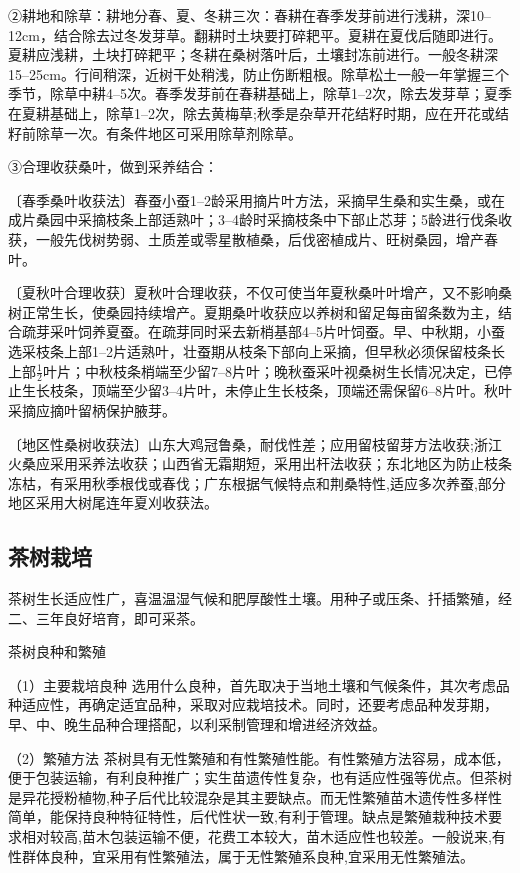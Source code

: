 \documentclass{ctexbook}
\begin{document}
②耕地和除草：耕地分春、夏、冬耕三次：春耕在春季发芽前进行浅耕，深10--12cm，结合除去过冬发芽草。翻耕时土块要打碎耙平。夏耕在夏伐后随即进行。夏耕应浅耕，土块打碎耙平；冬耕在桑树落叶后，土壤封冻前进行。一般冬耕深15--25cm。行间稍深，近树干处稍浅，防止伤断粗根。除草松土一般一年掌握三个季节，除草中耕4--5次。春季发芽前在春耕基础上，除草1--2次，除去发芽草；夏季在夏耕基础上，除草1--2次，除去黄梅草;秋季是杂草开花结籽时期，应在开花或结籽前除草一次。有条件地区可采用除草剂除草。

③合理收获桑叶，做到采养结合：

〔春季桑叶收获法〕春蚕小蚕1--2龄采用摘片叶方法，采摘早生桑和实生桑，或在成片桑园中采摘枝条上部适熟叶；3--4龄时采摘枝条中下部止芯芽；5龄进行伐条收获，一般先伐树势弱、土质差或零星散植桑，后伐密植成片、旺树桑园，增产春叶。

〔夏秋叶合理收获〕夏秋叶合理收获，不仅可使当年夏秋桑叶叶增产，又不影响桑树正常生长，使桑园持续增产。夏期桑叶收获应以养树和留足每亩留条数为主，结合疏芽采叶饲养夏蚕。在疏芽同时采去新梢基部4--5片叶饲蚕。早、中秋期，小蚕选采枝条上部1--2片适熟叶，壮蚕期从枝条下部向上采摘，但早秋必须保留枝条长上部$\frac{1}{2}$叶片；中秋枝条梢端至少留7--8片叶；晚秋蚕采叶视桑树生长情况决定，已停止生长枝条，顶端至少留3--4片叶，未停止生长枝条，顶端还需保留6--8片叶。秋叶采摘应摘叶留柄保护腋芽。

〔地区性桑树收获法〕山东大鸡冠鲁桑，耐伐性差；应用留枝留芽方法收获;浙江火桑应采用采养法收获；山西省无霜期短，采用出杆法收获；东北地区为防止枝条冻枯，有采用秋季根伐或春伐；广东根据气候特点和荆桑特性,适应多次养蚕,部分地区采用大树尾连年夏刈收获法。
\subsection{茶树栽培}
茶树生长适应性广，喜温温湿气候和肥厚酸性土壤。用种子或压条、扦插繁殖，经二、三年良好培育，即可采茶。

茶树良种和繁殖

（1）主要栽培良种 选用什么良种，首先取决于当地土壤和气候条件，其次考虑品种适应性，再确定适宜品种，采取对应栽培技术。同时，还要考虑品种发芽期，早、中、晚生品种合理搭配，以利采制管理和增进经济效益。

（2）繁殖方法 茶树具有无性繁殖和有性繁殖性能。有性繁殖方法容易，成本低，便于包装运输，有利良种推广；实生苗遗传性复杂，也有适应性强等优点。但茶树是异花授粉植物,种子后代比较混杂是其主要缺点。而无性繁殖苗木遗传性多样性简单，能保持良种特征特性，后代性状一致,有利于管理。缺点是繁殖栽种技术要求相对较高,苗木包装运输不便，花费工本较大，苗木适应性也较差。一般说来,有性群体良种，宜采用有性繁殖法，属于无性繁殖系良种,宜采用无性繁殖法。
\end{document}
